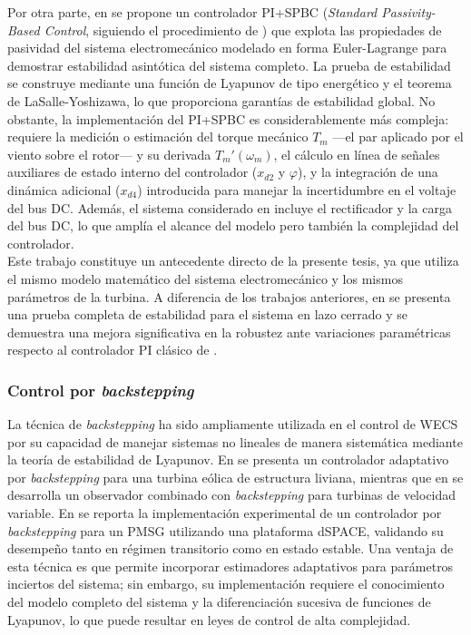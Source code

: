 Por otra parte, en \cite{cisneros2020} se propone un controlador PI+SPBC 
(\emph{Standard Passivity-Based Control}, siguiendo el procedimiento de 
\cite{Ortega1998}) que explota las propiedades de pasividad del sistema 
electromecánico modelado en forma Euler-Lagrange para demostrar estabilidad 
asintótica del sistema completo. La prueba de estabilidad se construye mediante 
una función de Lyapunov de tipo energético y el teorema de LaSalle-Yoshizawa, 
lo que proporciona garantías de estabilidad global. No obstante, la 
implementación del PI+SPBC es considerablemente más compleja: requiere la 
medición o estimación del torque mecánico $T_m$ ---el par aplicado por el 
viento sobre el rotor--- y su derivada $T_m'(\omega_m)$, el cálculo en línea 
de señales auxiliares de estado interno del controlador ($x_{d2}$ y 
$\varphi$), y la integración de una dinámica adicional ($x_{d4}$) introducida 
para manejar la incertidumbre en el voltaje del bus DC. Además, el sistema 
considerado en \cite{cisneros2020} incluye el rectificador y la carga del bus 
DC, lo que amplía el alcance del modelo pero también la complejidad del 
controlador.
\\

Este trabajo constituye un antecedente directo de la presente tesis, ya que 
utiliza el mismo modelo matemático del sistema electromecánico y los mismos 
parámetros de la turbina. A diferencia de los trabajos anteriores, en 
\cite{cisneros2020} se presenta una prueba completa de estabilidad para el 
sistema en lazo cerrado y se demuestra una mejora significativa en la 
robustez ante variaciones paramétricas respecto al controlador PI clásico 
de \cite{chinchilla2006}. 

\subsubsection*{Control por \emph{backstepping}}
La técnica de \emph{backstepping} ha sido ampliamente utilizada en el control 
de WECS por su capacidad de manejar sistemas no lineales de manera 
sistemática mediante la teoría de estabilidad de Lyapunov. En 
\cite{Galeazzi2015} se presenta un controlador adaptativo por 
\emph{backstepping} para una turbina eólica de estructura liviana, mientras 
que en \cite{Galeazzi2013} se desarrolla un observador combinado con 
\emph{backstepping} para turbinas de velocidad variable. En 
\cite{Bossoufi2020} se reporta la implementación experimental de un 
controlador por \emph{backstepping} para un PMSG utilizando una plataforma 
dSPACE, validando su desempeño tanto en régimen transitorio como en estado 
estable. Una ventaja de esta técnica es que permite incorporar estimadores 
adaptativos para parámetros inciertos del sistema; sin embargo, su 
implementación requiere el conocimiento del modelo completo del sistema y 
la diferenciación sucesiva de funciones de Lyapunov, lo que puede resultar 
en leyes de control de alta complejidad.

